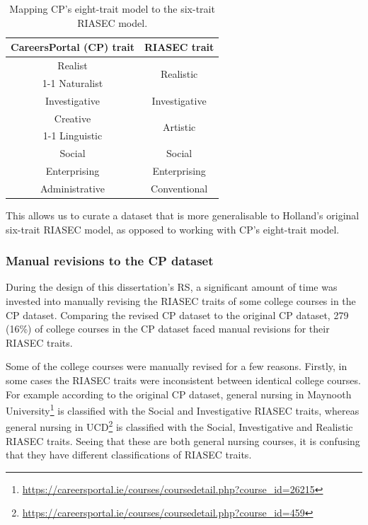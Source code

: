 \begin{table}[H]
\centering
\begin{tabular}{|c|c|}
\hline
\textbf{CareersPortal (CP) trait} & \textbf{RIASEC trait}\\
\hline
Realist & \multirow{2}{*}{Realistic}\\
\cline{1-1}
Naturalist & \\
\hline
Investigative & Investigative\\
\hline
Creative & \multirow{2}{*}{Artistic}\\
\cline{1-1}
Linguistic & \\
\hline
Social & Social\\
\hline
Enterprising & Enterprising\\
\hline
Administrative & Conventional\\
\hline
\end{tabular}
\caption{Mapping CP's eight-trait model to the six-trait RIASEC model.}
\label{tab:cp-to-riasec}
\end{table}

This allows us to curate a dataset that is more generalisable to Holland's original six-trait RIASEC model,
as opposed to working with CP's eight-trait model.

\subsubsection{Manual revisions to the CP dataset}


During the design of this dissertation's RS, 
a significant amount of time was invested into manually revising the RIASEC traits of some college 
courses in the CP dataset. 
Comparing the revised CP dataset to the original CP dataset, 
279 (16\%) of college courses in the CP dataset faced manual revisions for their RIASEC traits.

Some of the college courses were manually revised for a few reasons.
Firstly, in some cases the RIASEC traits were inconsistent between identical college courses.
For example according to the original CP dataset, general nursing in Maynooth University\footnote{\url{https://careersportal.ie/courses/coursedetail.php?course_id=26215}} is classified 
with the Social and Investigative RIASEC traits, whereas general nursing in UCD\footnote{\url{https://careersportal.ie/courses/coursedetail.php?course_id=459}}
is classified with the Social, Investigative and Realistic RIASEC traits.
Seeing that these are both general nursing courses, it is confusing that they have different classifications of RIASEC traits.

